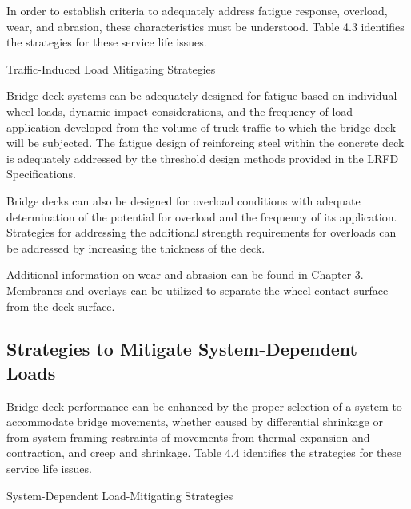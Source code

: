 In order to establish criteria to adequately address fatigue response, overload, wear, and abrasion, these
characteristics must be understood. Table 4.3 identifies the strategies for these service life issues.

\begin{table}
  \caption{Traffic-Induced Load Mitigating Strategies}
  \label{tab:traffic-induced-strategy}
\end{table}

Bridge deck systems can be adequately designed for fatigue based on individual wheel loads, dynamic impact
considerations, and the frequency of load application developed from the volume of truck traffic to which the bridge
deck will be subjected. The fatigue design of reinforcing steel within the concrete deck is adequately addressed by
the threshold design methods provided in the LRFD Specifications.

Bridge decks can also be designed for overload conditions with adequate determination of the potential for
overload and the frequency of its application. Strategies for addressing the additional strength requirements for
overloads can be addressed by increasing the thickness of the deck.

Additional information on wear and abrasion can be found in Chapter 3. Membranes and overlays can be utilized
to separate the wheel contact surface from the deck surface.

\subsection{Strategies to Mitigate System-Dependent Loads}
\label{subsec:strategies-mitigate-system-dependent}

Bridge deck performance can be enhanced by the proper selection of a system to accommodate bridge
movements, whether caused by differential shrinkage or from system framing restraints of movements from thermal
expansion and contraction, and creep and shrinkage. Table 4.4 identifies the strategies for these service life issues.


\begin{table}
  \caption{System-Dependent Load-Mitigating Strategies}
  \label{tab:system-dependent-strategy}
\end{table}

